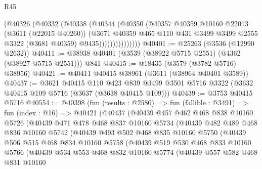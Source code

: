 \begin{lexlean}{R45}
\begin{coremodule}
                    (@40326
                      (@40332
                        (@40338
                          (@40344
                            (@40350
                              (@40357
                                @40359
                                @10160
                                @22013
                                (@3611 (@22015 @40260))
                                (@3671
                                  @40359
                                  @465
                                  @110
                                  @431
                                  @3499
                                  @3499
                                  @2555
                                  @3322
                                  (@3681 @40359)
                                  @9435)))))))))))))))
@40401 := @25263 (@3536 (@12990 @2632))
@40411 := @38938 @40401 (@3539 (@38922 @5715 @2551) (@4362 (@38927 @5715 @2551))) @841
@40415 := @18435 (@3579 (@3782 @5716) @38956)
@40421 := @40411 @40415 @38961 (@3611 (@38964 @40401 @3589))
@40437 := @3621
    @40415
    @110
    @423
    @839
    @3499
    @3501
    @5716
    @3322
    (@3632 @40415 @109 @5716 (@3637 (@3638 @40415 @109)))
@40439 := @3753 @40415 @5716
@40554 := @40398
    (fun (results : @2580) =>
    fun (fallible : @3491) =>
    fun (index : @16) =>
    @40421
      (@40437
        (@40439
          @457
          @462
          @468
          @838
          @10160
          @5726
          (@40439
            @471
            @478
            @468
            @837
            @10160
            @5734
            (@40439
              @482
              @489
              @468
              @836
              @10160
              @5742
              (@40439
                @493
                @502
                @468
                @835
                @10160
                @5750
                (@40439
                  @506
                  @515
                  @468
                  @834
                  @10160
                  @5758
                  (@40439
                    @519
                    @530
                    @468
                    @833
                    @10160
                    @5766
                    (@40439
                      @534
                      @553
                      @468
                      @832
                      @10160
                      @5774
                      (@40439
                        @557
                        @582
                        @468
                        @831
                        @10160

\end{coremodule}
\end{lexlean}
